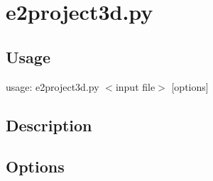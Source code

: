 \section{e2project3d.py}  \label{e2project3d.py}
\subsection{Usage}
usage: e2project3d.py $<$input file$>$ [options]


\subsection{Description}

\subsection{Options}

